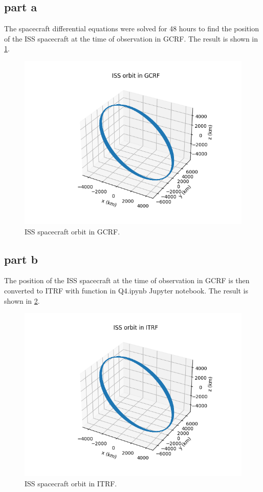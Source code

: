 \subsection{part a}
The spacecraft differential equations were solved for 48 hours to find the position of the ISS spacecraft at the time of observation in GCRF. The result is shown in \ref{fig:ISS_orbit_GCRF}.

\begin{figure}[H]
    \centering
    \includegraphics[width=\textwidth]{../Figure/Q4/GCRF.png}
    \caption{ISS spacecraft orbit in GCRF.}
    \label{fig:ISS_orbit_GCRF}
\end{figure}

\subsection{part b}
The position of the ISS spacecraft at the time of observation in GCRF is then converted to ITRF with 
 function in Q4.ipynb Jupyter notebook.
The result is shown in \ref{fig:ISS_orbit_ITRF}.

\begin{figure}[H]
    \centering
    \includegraphics[width=\textwidth]{../Figure/Q4/ITRF.png}
    \caption{ISS spacecraft orbit in ITRF.}
    \label{fig:ISS_orbit_ITRF}
\end{figure}

